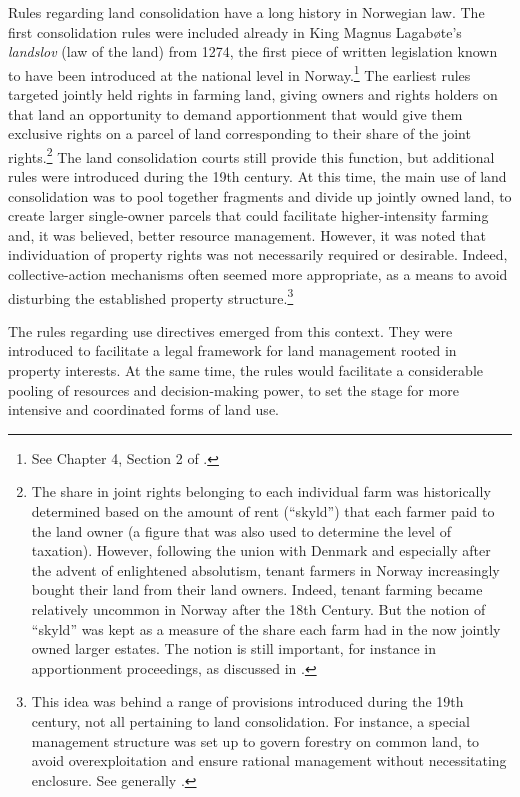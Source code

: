 Rules regarding land consolidation have a long history in Norwegian law. The first consolidation rules were included already in King Magnus Lagabøte's \emph{landslov} (law of the land) from 1274, the first piece of written legislation known to have been introduced at the national level in Norway.\footnote{See Chapter 4, Section 2 of \cite{nou02}.} The earliest rules targeted jointly held rights in farming land, giving owners and rights holders on that land an opportunity to demand apportionment that would give them exclusive rights on a parcel of land corresponding to their share of the joint rights.\footnote{The share in joint rights belonging to each individual farm was historically determined based on the amount of rent (``skyld'') that each farmer paid to the land owner (a figure that was also used to determine the level of taxation). However, following the union with Denmark and especially after the advent of enlightened absolutism, tenant farmers in Norway increasingly bought their land from their land owners.  Indeed, tenant farming became relatively uncommon in Norway after the 18th Century. But the notion of ``skyld'' was kept as a measure of the share each farm had in the now jointly owned larger estates. The notion is still important, for instance in apportionment proceedings, as discussed in \cite{ravna09a}.} The land consolidation courts still provide this function, but additional rules were introduced during the 19th century. At this time, the main use of land consolidation was to pool together fragments and divide up jointly owned land, to create larger single-owner parcels that could facilitate higher-intensity farming and, it was believed, better resource management. However, it was noted that individuation of property rights was not necessarily required or desirable. Indeed, collective-action mechanisms often seemed more appropriate, as a means to avoid disturbing the established property structure.\footnote{This idea was behind a range of provisions introduced during the 19th century, not all pertaining to land consolidation. For instance, a special management structure was set up to govern forestry on common land, to avoid overexploitation and ensure rational management without necessitating enclosure. See generally \cite{stenseth10a}.}

The rules regarding use directives emerged from this context. They were introduced to facilitate a legal framework for land management rooted in property interests. At the same time, the rules would facilitate a considerable pooling of resources and decision-making power, to set the stage for more intensive and coordinated forms of land use.

